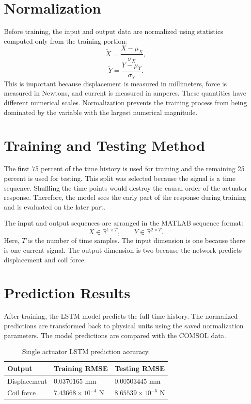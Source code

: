 \documentclass[11pt]{article}
\begin{document}
\section{Normalization}

Before training, the input and output data are normalized using statistics computed only from the training portion:
\begin{equation}
    \tilde{X} = \frac{X - \mu_X}{\sigma_X},
\end{equation}
\begin{equation}
    \tilde{Y} = \frac{Y - \mu_Y}{\sigma_Y}.
\end{equation}
This is important because displacement is measured in millimeters, force is measured in Newtons, and current is measured in amperes. These quantities have different numerical scales. Normalization prevents the training process from being dominated by the variable with the largest numerical magnitude.

\section{Training and Testing Method}

The first 75 percent of the time history is used for training and the remaining 25 percent is used for testing. This split was selected because the signal is a time sequence. Shuffling the time points would destroy the causal order of the actuator response. Therefore, the model sees the early part of the response during training and is evaluated on the later part.

The input and output sequences are arranged in the MATLAB sequence format:
\[
    X \in \mathbb{R}^{1 \times T}, \qquad Y \in \mathbb{R}^{2 \times T}.
\]
Here, \(T\) is the number of time samples. The input dimension is one because there is one current signal. The output dimension is two because the network predicts displacement and coil force.

\section{Prediction Results}

After training, the LSTM model predicts the full time history. The normalized predictions are transformed back to physical units using the saved normalization parameters. The model predictions are compared with the COMSOL data.

\begin{table}[H]
\centering
\caption{Single actuator LSTM prediction accuracy.}
\begin{tabular}{lll}
\toprule
Output & Training RMSE & Testing RMSE \\
\midrule
Displacement & \(0.0370165\) mm & \(0.00503445\) mm \\
Coil force & \(7.43668 \times 10^{-4}\) N & \(8.65539 \times 10^{-5}\) N \\
\bottomrule
\end{tabular}
\end{table}
\end{document}
